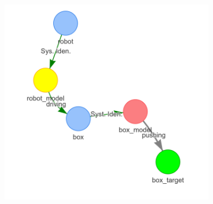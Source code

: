 \begin{figure}[H]
\begin{subfigure}{.3\textwidth}
    \includegraphics[width=1.05\textwidth]{figures/proposed_method/connecting_nodes/robot_push/robot_push_6}
    \caption{}\label{subfig:robot_push_6}
    \end{subfigure}


\end{figure}
